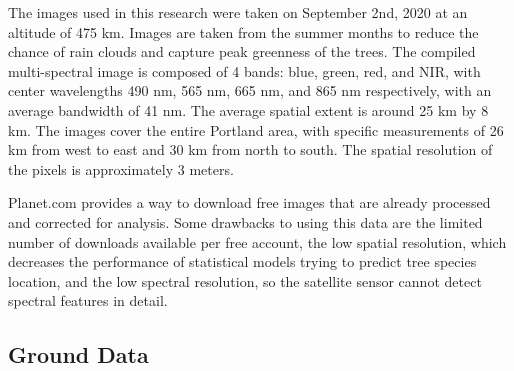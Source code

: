 \documentclass[12pt,twoside]{reedthesis}
\begin{document}
The images used in this research were taken on September 2nd, 2020 at an altitude of 475 km. Images are taken from the summer months to reduce the chance of rain clouds and capture peak greenness of the trees. The compiled multi-spectral image is composed of 4 bands: blue, green, red, and NIR, with center wavelengths 490 nm, 565 nm, 665 nm, and 865 nm respectively, with an average bandwidth of 41 nm. The average spatial extent is around 25 km by 8 km. The images cover the entire Portland area, with specific measurements of 26 km from west to east and 30 km from north to south. The spatial resolution of the pixels is approximately 3 meters.

Planet.com provides a way to download free images that are already processed and corrected for analysis. Some drawbacks to using this data are the limited number of downloads available per free account, the low spatial resolution, which decreases the performance of statistical models trying to predict tree species location, and the low spectral resolution, so the satellite sensor cannot detect spectral features in detail.

\hypertarget{ground-data}{%
\subsection{Ground Data}\label{ground-data}}
\end{document}
